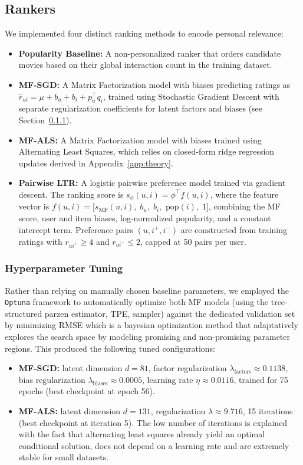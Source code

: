 \documentclass[11pt]{article}
\begin{document}
\subsection{Rankers}

\noindent We implemented four distinct ranking methods to encode personal relevance:
\begin{itemize}
    \item \textbf{Popularity Baseline:} A non-personalized ranker that orders candidate movies based on their global interaction count in the training dataset.
    \item \textbf{MF-SGD:} A Matrix Factorization model with biases predicting ratings as $\hat{r}_{ui} = \mu + b_u + b_i + p_u^\top q_i$, trained using Stochastic Gradient Descent with separate regularization coefficients for latent factors and biases (see Section~\ref{sec:hyperparams}).
    \item \textbf{MF-ALS:} A Matrix Factorization model with biases trained using Alternating Least Squares, which relies on closed-form ridge regression updates derived in Appendix~\ref{app:theory}.
    \item \textbf{Pairwise LTR:} A logistic pairwise preference model trained via gradient descent. The ranking score is $s_\phi(u,i) = \phi^\top f(u,i)$, where the feature vector is $f(u,i) = [s_{\text{MF}}(u,i),\; b_u,\; b_i,$ $\text{pop}(i),\; 1]$, combining the MF score, user and item biases, log-normalized popularity, and a constant intercept term. Preference pairs $(u, i^+, i^-)$ are constructed from training ratings with $r_{ui^+} \ge 4$ and $r_{ui^-} \le 2$, capped at 50 pairs per user.
\end{itemize}

\subsubsection{Hyperparameter Tuning}
\label{sec:hyperparams}

\noindent Rather than relying on manually chosen baseline parameters, we employed the \texttt{Optuna} framework to automatically optimize both MF models (using the tree-structured parzen estimator, TPE, sampler) against the dedicated validation set by minimizing RMSE which is a bayesian optimization method that adaptatively explores the search space by modeling promising and non-promising parameter regions. This produced the following tuned configurations:

\begin{itemize}
    \item \textbf{MF-SGD:} latent dimension $d = 81$, factor regularization $\lambda_{\text{factors}} \approx 0.1138$, bias regularization $\lambda_{\text{biases}} \approx 0.0005$, learning rate $\eta \approx 0.0116$, trained for 75 epochs (best checkpoint at epoch 56).
    \item \textbf{MF-ALS:} latent dimension $d = 131$, regularization $\lambda \approx 9.716$, 15 iterations (best checkpoint at iteration 5). The low number of iterations is explained with the fact that alternating least squares already yield an optimal conditional solution, does not depend on a learning rate and are extremely stable for small datasets. 
\end{itemize}
\end{document}

